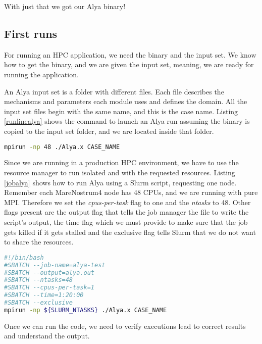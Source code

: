 With just that we got our Alya binary!

\subsection{First runs}

For running an HPC application, we need the binary and the input set. We know how to get the binary, and we are given the input set, meaning, we are ready for running the application.

An Alya input set is a folder with different files. Each file describes the mechanisms and parameters each module uses and defines the domain. All the input set files begin with the same name, and this is the case name. Listing \ref{runlinealya} shows the command to launch an Alya run assuming the binary is copied to the input set folder, and we are located inside that folder.

\begin{lstlisting}[language=sh, caption={Running Alya with 48 processes.}, label={runlinealya}]
mpirun -np 48 ./Alya.x CASE_NAME
\end{lstlisting}


Since we are running in a production HPC environment, we have to use the resource manager to run isolated and with the requested resources. Listing \ref{jobalya} shows how to run Alya using a Slurm script, requesting one node. Remember each MareNostrum4 node has 48 CPUs, and we are running with pure MPI. Therefore we set the \textit{cpus-per-task} flag to one and the \textit{ntasks} to 48. Other flags present are the output flag that tells the job manager the file to write the script's output, the time flag which we must provide to make sure that the job gets killed if it gets stalled and the exclusive flag tells Slurm that we do not want to share the resources.

\begin{lstlisting}[language=sh, caption={Running Alya with SLURM.}, label={jobalya}]
#!/bin/bash
#SBATCH --job-name=alya-test
#SBATCH --output=alya.out
#SBATCH --ntasks=48
#SBATCH --cpus-per-task=1
#SBATCH --time=1:20:00
#SBATCH --exclusive
mpirun -np ${SLURM_NTASKS} ./Alya.x CASE_NAME
\end{lstlisting}

Once we can run the code, we need to verify executions lead to correct results and understand the output.
